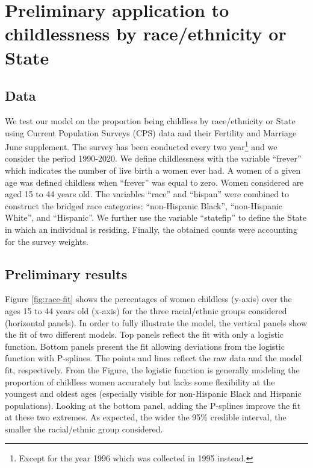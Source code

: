 \documentclass[
  11pt,
  letterpaper,
]{article}
\begin{document}
\hypertarget{preliminary-application-to-childlessness-by-raceethnicity-or-state}{%
\section{Preliminary application to childlessness by race/ethnicity or State}\label{preliminary-application-to-childlessness-by-raceethnicity-or-state}}

\hypertarget{data}{%
\subsection{Data}\label{data}}

We test our model on the proportion being childless by race/ethnicity or State using Current Population Surveys (CPS) data and their Fertility and Marriage June supplement. The survey has been conducted every two year\footnote{Except for the year 1996 which was collected in 1995 instead.} and we consider the period 1990-2020. We define childlessness with the variable ``frever'' which indicates the number of live birth a women ever had. A women of a given age was defined childless when ``frever'' was equal to zero. Women considered are aged 15 to 44 years old. The variables ``race'' and ``hispan'' were combined to construct the bridged race categories: ``non-Hispanic Black'', ``non-Hispanic White'', and ``Hispanic''. We further use the variable ``statefip'' to define the State in which an individual is residing. Finally, the obtained counts were accounting for the survey weights.

\hypertarget{preliminary-results}{%
\subsection{Preliminary results}\label{preliminary-results}}

Figure \ref{fig:race-fit} shows the percentages of women childless (y-axis) over the ages 15 to 44 years old (x-axis) for the three racial/ethnic groups considered (horizontal panels). In order to fully illustrate the model, the vertical panels show the fit of two different models. Top panels reflect the fit with only a logistic function. Bottom panels present the fit allowing deviations from the logistic function with P-splines. The points and lines reflect the raw data and the model fit, respectively. From the Figure, the logistic function is generally modeling the proportion of childless women accurately but lacks some flexibility at the youngest and oldest ages (especially visible for non-Hispanic Black and Hispanic populations). Looking at the bottom panel, adding the P-splines improve the fit at these two extremes. As expected, the wider the 95\% credible interval, the smaller the racial/ethnic group considered.
\end{document}
